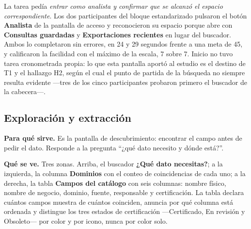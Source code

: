 \begin{uxnota}
La tarea pedía \emph{entrar como analista y confirmar que se alcanzó el espacio correspondiente}.
Los dos participantes del bloque estandarizado pulsaron el botón \textbf{Analista} de la pantalla
de acceso y reconocieron su espacio porque abre con \textbf{Consultas guardadas} y
\textbf{Exportaciones recientes} en lugar del buscador. Ambos lo completaron sin errores, en
24 y 29 segundos frente a una meta de 45, y calificaron la facilidad con el máximo de la escala,
7 sobre 7. Inicio no tuvo tarea cronometrada propia: lo que esta pantalla aportó al estudio es el
destino de T1 y el hallazgo H2, según el cual el punto de partida de la búsqueda no siempre resulta
evidente ---tres de los cinco participantes probaron primero el buscador de la cabecera---.
\end{uxnota}

\clearpage
\subsection{Exploración y extracción}

\textbf{Para qué sirve.} Es la pantalla de descubrimiento: encontrar el campo antes de pedir el
dato. Responde a la pregunta \enquote{¿qué dato necesito y dónde está?}.

\textbf{Qué se ve.} Tres zonas. Arriba, el buscador \textbf{¿Qué dato necesitas?}; a la izquierda,
la columna \textbf{Dominios} con el conteo de coincidencias de cada uno; a la derecha, la tabla
\textbf{Campos del catálogo} con seis columnas: nombre físico, nombre de negocio, dominio, fuente,
responsable y certificación. La tabla declara cuántos campos muestra de cuántos coinciden, anuncia
por qué columna está ordenada y distingue los tres estados de certificación ---Certificado, En
revisión y Obsoleto--- por color y por icono, nunca por color solo.


